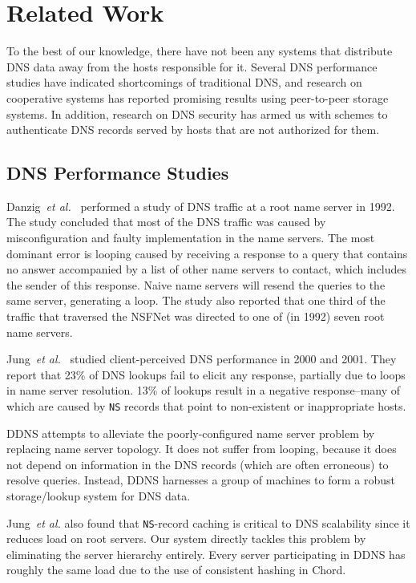 \section{Related Work}

To the best of our knowledge, there have not
been any systems that distribute DNS data away
from the hosts responsible for it.
Several DNS performance
studies have indicated shortcomings 
of traditional DNS, and research on cooperative 
systems has reported promising results using 
peer-to-peer storage systems. In addition, research on
DNS security has armed us with schemes to authenticate
DNS records served by hosts that are not authorized for them.
 
\subsection{DNS Performance Studies}

Danzig~{\it et al.}~\cite{dnsroot:sigcomm92} performed 
a study of DNS traffic at a root name server in 
1992. The study concluded that most of the DNS traffic 
was caused by misconfiguration and faulty implementation
in the name servers. The most dominant error is looping caused
by receiving a response to a query that contains no answer
accompanied by a list of other name servers to contact, which
includes the sender of this response. Naive name servers 
will resend the queries to the same server, generating a loop.
The study also reported that one third of the traffic 
that traversed the NSFNet was directed to one of (in 1992)
seven root name servers. 

Jung~{\it et al.}~\cite{dnscache:sigcommimw01} studied 
client-perceived DNS performance in 2000 and 2001.
They report that 23\% of DNS lookups fail to elicit
any response, partially due to loops in name server resolution.
13\% of lookups result in a negative response--many of which 
are caused by {\tt NS} records that point to non-existent 
or inappropriate hosts.

DDNS attempts to alleviate the poorly-configured
name server problem by replacing name server topology.
It does not suffer from looping, because it does not depend
on information in the DNS records (which are often erroneous)
to resolve queries. Instead, DDNS harnesses a group of machines
to form a robust storage/lookup system for DNS data. 

Jung~{\it et al.} also found that {\tt NS}-record caching
is critical to DNS scalability since it reduces load on 
root servers. Our system directly tackles this problem by 
eliminating the server hierarchy entirely.
Every server participating in DDNS has roughly
the same load due to the use of consistent hashing in Chord.

